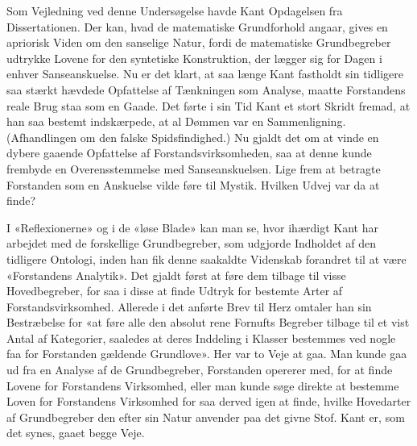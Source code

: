 \documentclass[12pt,a4paper]{article}
\newcommand{\apage}[1]{\marginnote{\footnotesize\textit{[#1]}}}
\begin{document}
Som Vejledning ved denne Undersøgelse havde Kant Opdagelsen fra
Dissertationen. Der kan, hvad de matematiske Grundforhold angaar, gives
en apriorisk Viden om den sanselige Natur, fordi de matematiske
Grundbegreber udtrykke Lovene for den syntetiske Konstruktion, der lægger
sig for Dagen i enhver Sanseanskuelse. Nu er det klart, at saa længe Kant
fastholdt sin tidligere saa stærkt hævdede Opfattelse af Tænkningen som
Analyse, maatte Forstandens reale Brug staa som en Gaade. Det førte i sin
Tid Kant et stort Skridt fremad, at han saa bestemt indskærpede, at al
Dømmen var en Sammenligning. (Afhandlingen om den falske Spidsfindighed.)
Nu gjaldt det om at vinde en dybere gaaende Opfattelse af
Forstandsvirksomheden, saa at denne kunde frembyde en Overensstemmelse
med Sanseanskuelsen. Lige frem at betragte Forstanden som en Anskuelse
vilde føre til Mystik. Hvilken Udvej var da at finde?

I «Reflexionerne» og i de «løse Blade» kan man se, hvor ihærdigt Kant har
arbejdet med de forskellige Grundbegreber, som udgjorde Indholdet af den
tidligere Ontologi, inden han fik denne saakaldte Videnskab forandret til
at være «Forstandens Analytik». Det gjaldt først at føre dem tilbage til
visse Hovedbegreber, for saa i disse at finde Udtryk for bestemte Arter
af Forstandsvirksomhed. Allerede i det anførte Brev til Herz \apage{53}  omtaler han
sin Bestræbelse for «at føre alle den absolut rene Fornufts Begreber
tilbage til et vist Antal af Kategorier, saaledes at deres Inddeling i
Klasser bestemmes ved nogle faa for Forstanden gældende Grundlove». Her
var to Veje at gaa. Man kunde gaa ud fra en Analyse af de Grundbegreber,
Forstanden opererer med, for at finde Lovene for Forstandens Virksomhed,
eller man kunde søge direkte at bestemme Loven for Forstandens Virksomhed
for saa derved igen at finde, hvilke Hovedarter af Grundbegreber den
efter sin Natur anvender paa det givne Stof. Kant er, som det synes,
gaaet begge Veje.
\end{document}
